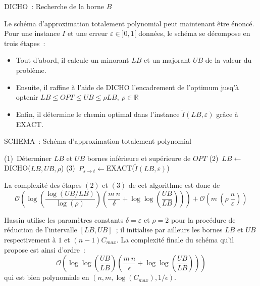 \documentclass[10pt,francais]{llncs}
\begin{document}
{\begin{algorithm}\label{algo-dicho}
\caption{DICHO~: Recherche de la borne $B$}
\BlankLine
{}
\BlankLine
{}
\end{algorithm}

 
Le sch\'ema d'approximation totalement polynomial peut maintenant \^etre \'enonc\'e. Pour une instance $I$ et une erreur $\varepsilon\in]0,1[$ donn\'ees, le sch\'ema se d\'ecompose en trois \'etapes~:
\begin{itemize}
 \item Tout d'abord, il calcule un minorant $LB$ et un majorant $UB$ de la valeur du probl\`eme.
 \item Ensuite, il raffine \`a l'aide de DICHO l'encadrement de l'optimum jusq'\`a optenir $LB\leq OPT\leq UB \leq \rho LB,\ \rho \in \mathbb{R}$
 \item Enfin, il d\'etermine le chemin optimal dans l'instance $\tilde{I}(LB,\varepsilon)$ gr\^ace \`a EXACT.
\end{itemize}

\begin{algorithm}\label{algo-schema}
\caption{SCHEMA~: Sch\'ema d'approximation totalement polynomial}

\BlankLine
{}
\BlankLine
(1)\ D\'eterminer $LB$ et $UB$ bornes inf\'erieure et sup\'erieure de $OPT$\;
\BlankLine
(2)\ $LB\leftarrow$DICHO($LB,UB,\rho$)\;
\BlankLine
(3)\ $P_{s\rightarrow t}\leftarrow$EXACT($\tilde{I}(LB,\varepsilon)$)\;

\end{algorithm}

La complexit\'e des \'etapes $(2)$ et $(3)$ de cet algorithme est donc de 
	$$\mathcal{O}\left(\log\left(\frac{\log(UB/LB)}{\log(\rho)}\right) \left(\frac{m\ n}{\delta}+\log\log\left(\frac{UB}{LB}\right)\right)\right) + 
	\mathcal{O}\left(m\ \left(\rho\ \frac{n}{\varepsilon}\right)\right)$$

Hassin \cite{Hassin1992} utilise les param\`etres constants $\delta=\varepsilon$ et $\rho=2$ pour la proc\'edure de r\'eduction de l'intervalle $[LB,UB]$~; il initialise par ailleurs les bornes $LB$ et $UB$ respectivement \`a $1$ et $(n-1)C_{max}$. La complexit\'e finale du sch\'ema qu'il propose est ainsi d'ordre~:
$$\mathcal{O}\left(\log\log\left(\frac{UB}{LB}\right)\left(\frac{m\ n}{\epsilon} + \log\log\left(\frac{UB}{LB}\right)\right)\right)$$
qui est bien polynomiale en $(n, m, \log(C_{max}), 1/\epsilon)$.


}
\end{document}
